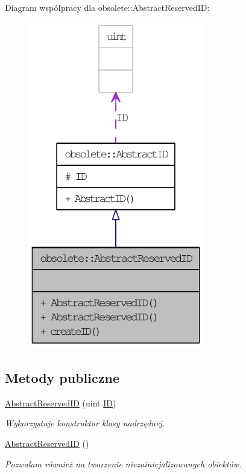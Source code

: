 Diagram współpracy dla obsolete::AbstractReservedID:\nopagebreak
\begin{figure}[H]
\begin{center}
\leavevmode
\includegraphics[width=216pt]{classobsolete_1_1AbstractReservedID__coll__graph}
\end{center}
\end{figure}
\subsection*{Metody publiczne}
\begin{DoxyCompactItemize}
\item 
\hyperlink{classobsolete_1_1AbstractReservedID_ad24b4475da6154fdc7d5d146a8fb311f}{AbstractReservedID} (uint \hyperlink{classobsolete_1_1ID}{ID})
\begin{DoxyCompactList}\small\item\em Wykorzystuje konstruktor klasy nadrzędnej. \item\end{DoxyCompactList}\item 
\hyperlink{classobsolete_1_1AbstractReservedID_ae01ec9522e9f8e7bbf28defe15266c2e}{AbstractReservedID} ()
\begin{DoxyCompactList}\small\item\em Pozwalam również na tworzenie niezainicjalizowanych obiektów. \item\end{DoxyCompactList}\end{DoxyCompactItemize}
